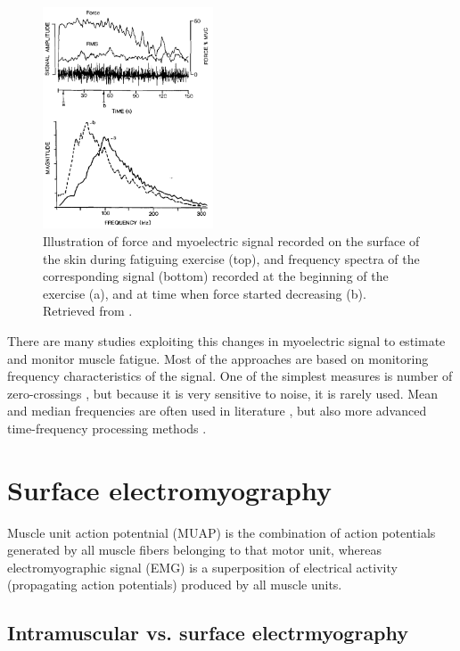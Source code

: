 \begin{figure}[ht]
\centering
\includegraphics[width=0.45\textwidth]{Images/introduction/fatigue.png}
\caption{Illustration of force and myoelectric signal recorded on the surface of the skin during fatiguing exercise (top), and frequency spectra of the corresponding signal (bottom) recorded at the beginning of the exercise (a), and at time when force started decreasing (b). Retrieved from \citet{DeLuca1984}.}
\label{fig:fatigue}
\end{figure}

There are many studies exploiting this changes in myoelectric signal to estimate and monitor muscle fatigue. Most of the approaches are based on monitoring frequency characteristics of the signal. One of the simplest measures is number of zero-crossings \citep{Hagg1981}, but because it is very sensitive to noise, it is rarely used. Mean and median frequencies are often used in literature \citep{Lindstrom1977, Merletti1997, Stulen1981}, but also more advanced time-frequency processing methods \citep{Knaflitz1999, Cifrek2000, Georgakis2003, Srhoj-Egekher2011a}.


\section{Surface electromyography}

Muscle unit action potentnial (MUAP) is the combination of action potentials generated by all muscle fibers belonging to that motor unit, whereas electromyographic signal (EMG) is a superposition of electrical activity (propagating action potentials) produced by all muscle units. 

\subsection{Intramuscular vs. surface electrmyography}

